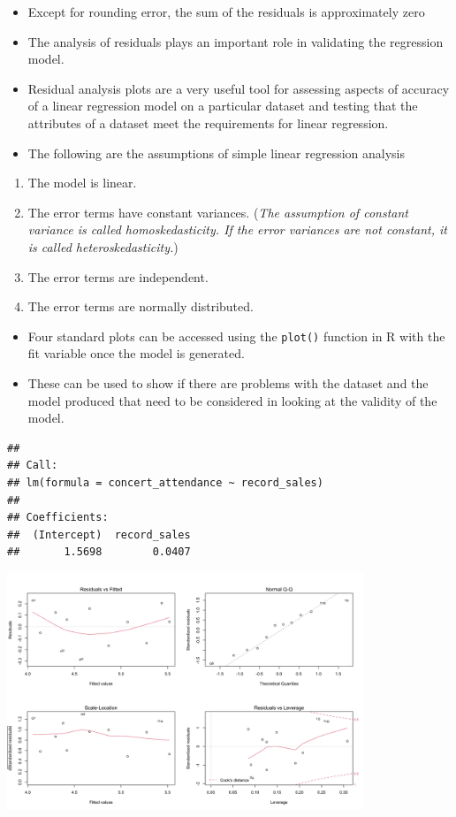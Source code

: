 \documentclass[]{book}
\providecommand{\tightlist}{%
  \setlength{\itemsep}{0pt}\setlength{\parskip}{0pt}}
\begin{document}
\begin{itemize}
\item
  Except for rounding error, the sum of the residuals is approximately zero
\item
  The analysis of residuals plays an important role in validating the regression model.
\item
  Residual analysis plots are a very useful tool for assessing aspects of accuracy of a linear regression model on a particular dataset and testing that the attributes of a dataset meet the requirements for linear regression.
\item
  The following are the assumptions of simple linear regression analysis
\end{itemize}

\begin{enumerate}
\def\labelenumi{\arabic{enumi}.}
\tightlist
\item
  The model is linear.
\item
  The error terms have constant variances. (\emph{The assumption of constant variance is called homoskedasticity. If the error variances are not constant, it is called heteroskedasticity.})
\item
  The error terms are independent.
\item
  The error terms are normally distributed.
\end{enumerate}

\begin{itemize}
\tightlist
\item
  Four standard plots can be accessed using the \texttt{plot()} function in R with the fit variable once the model is generated.
\item
  These can be used to show if there are problems with the dataset and the model produced that need to be considered in looking at the validity of the model.
\end{itemize}

\begin{verbatim}
## 
## Call:
## lm(formula = concert_attendance ~ record_sales)
## 
## Coefficients:
##  (Intercept)  record_sales  
##       1.5698        0.0407
\end{verbatim}

\begin{center}\includegraphics[width=0.8\textwidth]{figure/q2-1} \end{center}
\end{document}
